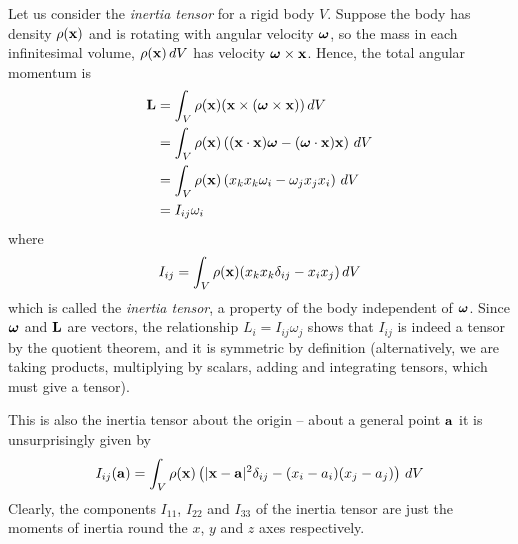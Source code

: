 \documentclass{../../template/note}
\begin{document}
    \begin{example*}
        Let us consider the \emph{inertia tensor} for a rigid body \(V\). Suppose the body has density \(\rho(\V x)\) and is rotating with angular velocity \(\V \omega\), so the mass in each infinitesimal volume, \(\rho(\V x) \D V\) has velocity \(\V \omega \times \V x\). Hence, the total angular momentum is
        \begin{align*}
            \V L &= \int_V \rho(\V x) (\V x \times (\V \omega \times \V x)) \D V \\
            &= \int_V \rho(\V x) \left((\V x \cdot \V x) \V \omega - (\V \omega \cdot \V x) \V x\right) \D V \\
            &= \int_V \rho(\V x) \left(x_kx_k\omega_i - \omega_jx_jx_i\right) \D V \\
            &= I_{ij}\omega_i
        \end{align*}
        where
        \begin{align*}
            I_{ij} = \int_V \rho(\V x) (x_kx_k \delta_{ij}-x_ix_j) \D V
        \end{align*}
        which is called the \emph{inertia tensor}, a property of the body independent of \(\V \omega\). Since \(\V \omega\) and \(\V L\) are vectors, the relationship \(L_i = I_{ij}\omega_j\) shows that \(I_{ij}\) is indeed a tensor by the quotient theorem, and it is symmetric by definition (alternatively, we are taking products, multiplying by scalars, adding and integrating tensors, which must give a tensor).

        This is also the inertia tensor about the origin -- about a general point \(\V a\) it is unsurprisingly given by
        \begin{align*}
            I_{ij}(\V a) = \int_V \rho(\V x) \left(|\V x-\V a|^2\delta_{ij} - (x_i-a_i)(x_j-a_j)\right) \D V
        \end{align*}
        Clearly, the components \(I_{11}\), \(I_{22}\) and \(I_{33}\) of the inertia tensor are just the moments of inertia round the \(x\), \(y\) and \(z\) axes respectively.       
    \end{example*}
    
\end{document}
